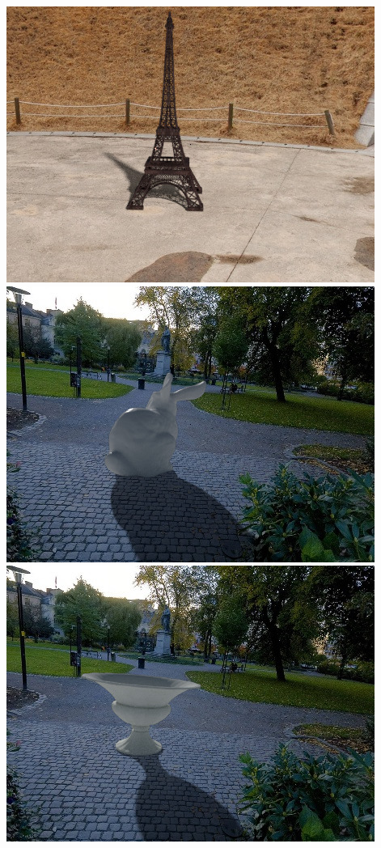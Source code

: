 \begin{multicols}{3}
\includegraphics[width=\linewidth]{virtual_object_insertions/pano_abpebgbgmpccye-6_6_es.jpg}\vspace{1em}
\includegraphics[width=\linewidth]{virtual_object_insertions/pano_abpezaevuxprln-0_5_es.jpg}\vspace{1em}
\includegraphics[width=\linewidth]{virtual_object_insertions/pano_abpezaevuxprln-0_7_es.jpg}\vspace{1em}

\end{multicols}
